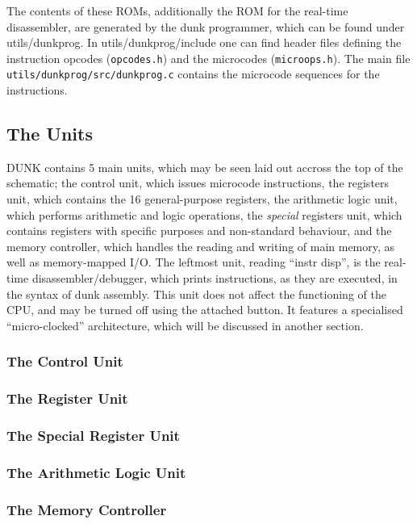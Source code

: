 \documentclass{article}
\begin{document}
The contents of these ROMs, additionally the ROM for the real-time disassembler, are generated by the dunk programmer, which can be found under utils/dunkprog. In utils/dunkprog/include one can find header files defining the instruction opcodes (\Verb|opcodes.h|) and the microcodes (\Verb|microops.h|). The main file \Verb|utils/dunkprog/src/dunkprog.c| contains the microcode sequences for the instructions.

\subsection{The Units}

DUNK contains 5 main units, which may be seen laid out accross the top of the schematic; the control unit, which issues microcode instructions, the registers unit, which contains the 16 general-purpose registers, the arithmetic logic unit, which performs arithmetic and logic operations, the \textit{special} registers unit, which contains registers with specific purposes and non-standard behaviour, and the memory controller, which handles the reading and writing of main memory, as well as memory-mapped I/O. The leftmost unit, reading ``instr disp'', is the real-time disassembler/debugger, which prints instructions, as they are executed, in the syntax of dunk assembly. This unit does not affect the functioning of the CPU, and may be turned off using the attached button. It features a specialised ``micro-clocked'' architecture, which will be discussed in another section.

\subsubsection{The Control Unit}

\subsubsection{The Register Unit}

\subsubsection{The Special Register Unit}

\subsubsection{The Arithmetic Logic Unit}

\subsubsection{The Memory Controller}
\end{document}
